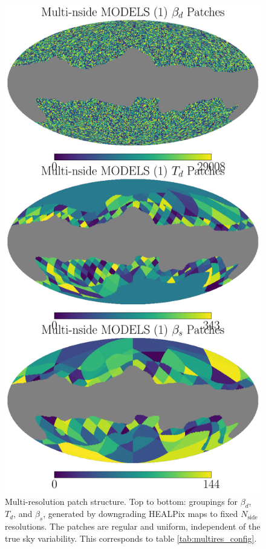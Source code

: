 \documentclass[fleqn,usenatbib]{mnras}
\begin{document}
\begin{figure}
    \centering
    \includegraphics[width=\linewidth]{figures/multires_patch_layout.pdf}
    \caption{
    Multi-resolution patch structure.
    Top to bottom: groupings for \( \beta_d \), \( T_d \), and \( \beta_s \), generated by downgrading HEALPix maps to fixed \( N_{\text{side}} \) resolutions.
    The patches are regular and uniform, independent of the true sky variability.
    This corresponds to table \ref{tab:multires_config}.
    }
    \label{fig:multires_patches}
\end{figure}
\end{document}
